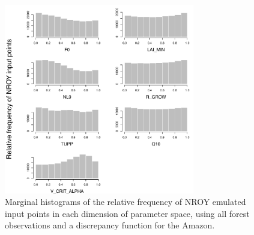 \documentclass[esd, article]{copernicus} %
\begin{document}
\begin{figure}[t]
\includegraphics[width=8.3cm]{graphics/input_frequency_marginal.pdf}
\caption{Marginal histograms of the relative frequency of NROY emulated input points in each dimension of parameter space, using all forest observations and a discrepancy function for the Amazon.}
\label{fig:input_frequency_marginal}
\end{figure}




\end{document}
